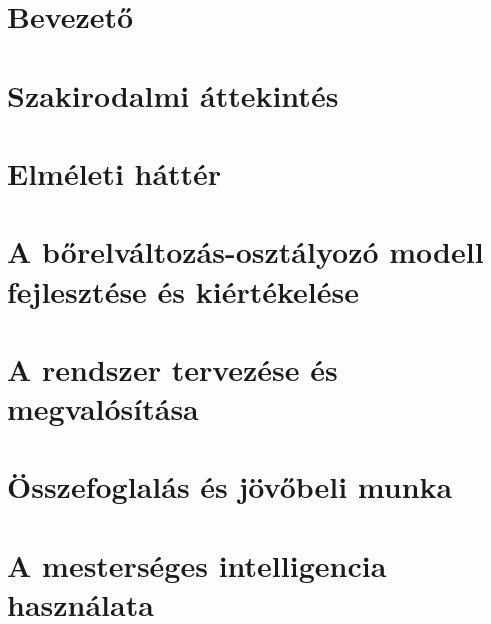 \documentclass[12pt, twosides]{report}
\begin{document}
\tableofcontents

\listoffigures

\chapter{Bevezető} \label{chpt:intro}


\chapter{Szakirodalmi áttekintés} \label{chpt:literature}


\chapter{Elméleti háttér} \label{chpt:theory}


\chapter{A bőrelváltozás-osztályozó modell fejlesztése és kiértékelése} \label{chpt:research}


\chapter{A rendszer tervezése és megvalósítása} \label{chpt:engineering}


\chapter{Összefoglalás és jövőbeli munka} \label{chpt:summary}





\appendix
\chapter{A mesterséges intelligencia használata}

\end{document}
